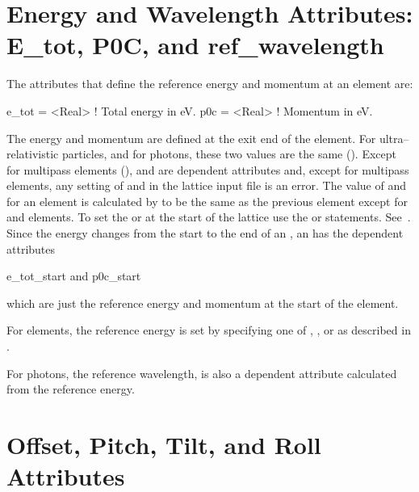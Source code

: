 \section[Energy and Wavelength Attributes]{Energy and Wavelength Attributes: E_tot, P0C, and ref_wavelength }
\label{s:energy}
The attributes that define the reference energy and momentum at an element are:
\begin{example}
  e_tot  = <Real>  ! Total energy in eV.
  p0c    = <Real>  ! Momentum in eV.
\end{example}
The energy and momentum are defined at the exit end of the element.
For ultra--relativistic particles, and for photons, these two values
are the same (). Except for multipass elements
(),  and  are dependent attributes
and, except for multipass elements, any setting of  and
 in the lattice input file is an error. The value of
 and  for an element is calculated by \bmad to be
the same as the previous element except for  and
 elements. To set the  or  at the start of
the lattice use the  or  statements.
See~. Since the energy changes from the start to the end
of an , an  has the dependent attributes
\begin{example}
  e_tot_start   and
  p0c_start
\end{example}
which are just the reference energy and momentum at the start of the element.

For  elements, the reference energy is set by specifying
one of , , or  as described in
.

For photons, the reference wavelength,  is also a
dependent attribute calculated from the reference energy.

\section{Offset, Pitch, Tilt, and Roll Attributes}
\label{s:offset}

